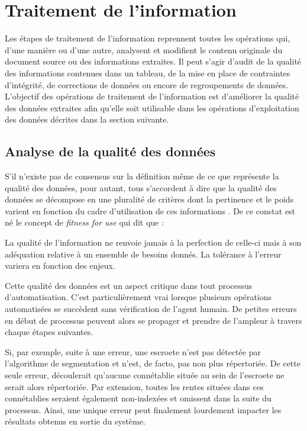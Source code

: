 \section{Traitement de l'information}
Les étapes de traitement de l'information reprennent toutes les opérations qui, d'une manière ou d'une autre, analysent et modifient le contenu originale du document source ou des informations extraites. Il peut s'agir d'audit de la qualité des informations contenues dans un tableau, de la mise en place de contraintes d'intégrité, de corrections de données ou encore de regroupements de données. 
L'objectif des opérations de traitement de l'information est d'améliorer la qualité des données extraites afin qu'elle soit utilisable dans les opérations d'exploitation des données décrites dans la section suivante.

\subsection{Analyse de la qualité des données}
S'il n'existe pas de consensus sur la définition même de ce que représente la qualité des données, pour autant, tous s'accordent à dire que la qualité des données se décompose en une pluralité de critères dont la pertinence et le poids varient en fonction du cadre d'utilisation de ces informations \parencite{berti-equille_qualite_2004}. De ce constat est né le concept de \textit{fitness for use} qui dit que :
\begin{displayquote}
    \og La qualité de l'information ne renvoie jamais à la perfection de celle-ci mais à son adéquation relative à un ensemble de besoins donnés. La tolérance à l'erreur variera en fonction des enjeux.\fg{} 
\end{displayquote} 
\vspace{0,5cm}

Cette qualité des données est un aspect critique dans tout processus d'automatisation. C'est particulièrement vrai lorsque plusieurs opérations automatisées se succèdent sans vérification de l'agent humain. De petites erreurs en début de processus peuvent alors se propager et prendre de l'ampleur à travers chaque étapes suivantes. 

Si, par exemple, suite à une erreur, une escroete n'est pas détectée par l'algorithme de segmentation et n'est, de facto,  pas non plus répertoriée. De cette seule erreur, découlerait qu'aucune connétablie située au sein de l'escroete ne serait alors répertoriée. Par extension, toutes les rentes situées dans ces connétablies seraient également non-indexées et omissent dans la suite du processus. Ainsi, une unique erreur peut finalement lourdement impacter les résultats obtenus en sortie du système.

